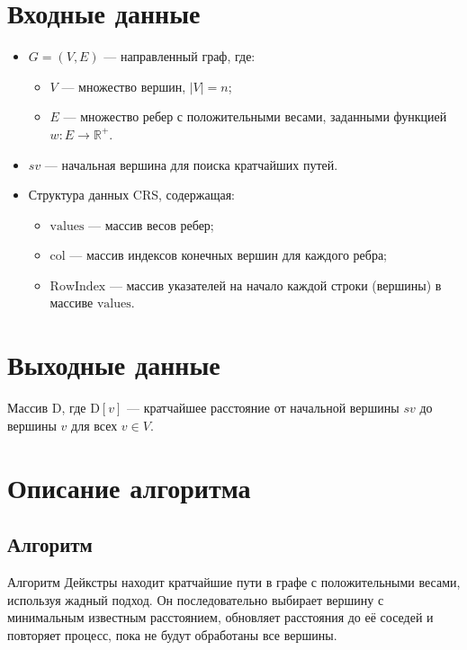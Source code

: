 \documentclass[12pt]{article}
\begin{document}
\section*{Входные данные}
\begin{itemize}
    \item \( G = (V, E) \) — направленный граф, где:
    \begin{itemize}
        \item \( V \) — множество вершин, \( |V| = n \);
        \item \( E \) — множество ребер с положительными весами, заданными функцией \( w: E \to \mathbb{R}^+ \).
    \end{itemize}
    \item \( sv \) — начальная вершина для поиска кратчайших путей.
    \item Структура данных CRS, содержащая:
    \begin{itemize}
        \item \( \text{values} \) — массив весов ребер;
        \item \( \text{col} \) — массив индексов конечных вершин для каждого ребра;
        \item \( \text{RowIndex} \) — массив указателей на начало каждой строки (вершины) в массиве \( \text{values} \).
    \end{itemize}
\end{itemize}

\section*{Выходные данные}
Массив \( \text{D} \), где \( \text{D}[v] \) — кратчайшее расстояние от начальной вершины \( sv \) до вершины \( v \) для всех \( v \in V \).

\newpage

\section{Описание алгоритма}

\subsection*{Алгоритм}
Алгоритм Дейкстры находит кратчайшие пути в графе с положительными весами, используя жадный подход. Он последовательно выбирает вершину с минимальным известным расстоянием, обновляет расстояния до её соседей и повторяет процесс, пока не будут обработаны все вершины.
\end{document}
